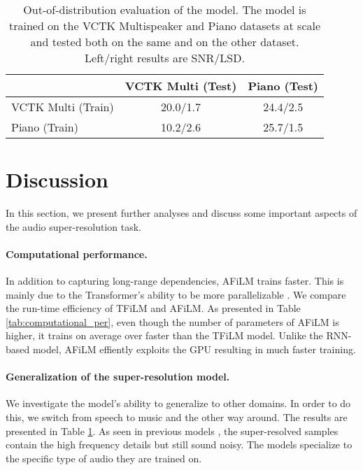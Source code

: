 \documentclass{article}
\begin{document}
\begin{table}[h]
\centering
\caption{Out-of-distribution evaluation of the model. The model is trained on the VCTK Multispeaker and Piano datasets at scale  and tested both on the same and on the other dataset. Left/right results are SNR/LSD.}
\label{tab:out_of_distribution}
\begin{tabular}{l|c|c|}
\cline{2-3}
\multicolumn{1}{l|}{}                    & \multicolumn{1}{c|}{VCTK Multi (Test)} & \multicolumn{1}{c|}{Piano (Test)} \\ \hline
\multicolumn{1}{|l|}{VCTK Multi (Train)} & 20.0/1.7                               & 24.4/2.5                          \\ \hline
\multicolumn{1}{|l|}{Piano (Train)}      & 10.2/2.6                               & 25.7/1.5                          \\ \hline
\end{tabular}
\end{table}

\section{Discussion}
In this section, we present further analyses and discuss some important aspects of the audio super-resolution task.

\paragraph*{Computational performance.} In addition to capturing long-range dependencies, AFiLM trains faster. This is mainly due to the Transformer's ability to be more parallelizable \cite{vaswani2017attention}. We compare the run-time efficiency of TFiLM and AFiLM. As presented in Table \ref{tab:computational_per}, even though the number of parameters of AFiLM is higher, it trains on average over  faster than the TFiLM model. Unlike the RNN-based model, AFiLM effiently exploits the GPU resulting in much faster training.

\paragraph*{Generalization of the super-resolution model.} We investigate the model's ability to generalize to other domains. In order to do this, we switch from speech to music and the other way around. The results are presented in Table \ref{tab:out_of_distribution}. As seen in previous models \cite{kuleshov2017audio,birnbaum2019temporal}, the super-resolved samples contain the high frequency details but still sound noisy. The models specialize to the specific type of audio they are trained on. 
\end{document}
